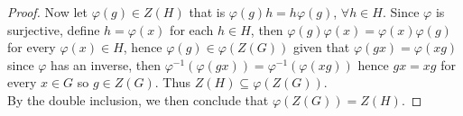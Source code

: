 \begin{assignment}[
  header=HeaderA,
  body=BodyA,
  title={Homework 4},
  duedate={\today},
  toc=false,
  toctitle={This appears on the Table of contents.},
  exlist=false
]
\begin{exer}[Theorem 25 f)]
\begin{proof}
    Now let $\varphi(g) \in Z(H)$ that is $\varphi(g)h = h\varphi(g)$, $\forall h \in H$. Since $\varphi$ is surjective, define $h=\varphi(x)$ for each $h \in H$, then  $\varphi(g)\varphi(x) = \varphi(x)\varphi(g)$ for every $\varphi(x) \in H$, hence $\varphi(g) \in \varphi(Z(G))$ given that $\varphi(gx) = \varphi(xg)$ since $\varphi$ has an inverse, then $\varphi^{-1}(\varphi(gx))=\varphi^{-1}(\varphi(xg))$ hence $gx = xg$ for every $x\in G$ so $g \in Z(G)$. Thus $Z(H) \subseteq \varphi(Z(G))$.\\

    By the double inclusion, we then conclude that $\varphi(Z(G)) = Z(H)$.
    \end{proof}
\end{exer}

\end{assignment}